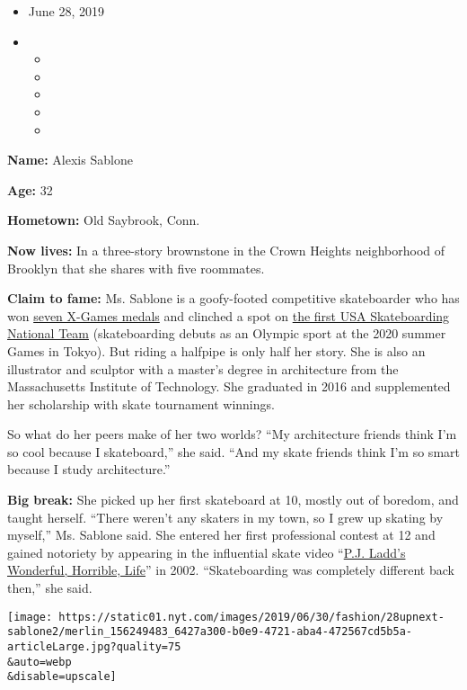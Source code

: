 \begin{itemize}
\item
  June 28, 2019
\item
  \begin{itemize}
  \item
  \item
  \item
  \item
  \item
  \end{itemize}
\end{itemize}

\textbf{Name:} Alexis Sablone

\textbf{Age:} 32

\textbf{Hometown:} Old Saybrook, Conn.

\textbf{Now lives:} In a three-story brownstone in the Crown Heights
neighborhood of Brooklyn that she shares with five roommates.

\textbf{Claim to fame:} Ms. Sablone is a goofy-footed competitive
skateboarder who has won
\href{http://www.xgames.com/athletes/3015198/alexis-sablone}{seven
X-Games medals} and clinched a spot on
\href{https://skateboarding.transworld.net/news/usa-skateboarding-olympic-team-announced/}{the
first USA Skateboarding National Team} (skateboarding debuts as an
Olympic sport at the 2020 summer Games in Tokyo). But riding a halfpipe
is only half her story. She is also an illustrator and sculptor with a
master's degree in architecture from the Massachusetts Institute of
Technology. She graduated in 2016 and supplemented her scholarship with
skate tournament winnings.

So what do her peers make of her two worlds? ``My architecture friends
think I'm so cool because I skateboard,'' she said. ``And my skate
friends think I'm so smart because I study architecture.''

\textbf{Big break:} She picked up her first skateboard at 10, mostly out
of boredom, and taught herself. ``There weren't any skaters in my town,
so I grew up skating by myself,'' Ms. Sablone said. She entered her
first professional contest at 12 and gained notoriety by appearing in
the influential skate video
``\href{http://www.skatevideosite.com/skatevideos/coliseum-pj-ladds-wonderful-horrible-life/soundtrack}{P.J.
Ladd's Wonderful, Horrible, Life}'' in 2002. ``Skateboarding was
completely different back then,'' she said.

\texttt{[image: https://static01.nyt.com/images/2019/06/30/fashion/28upnext-sablone2/merlin\_156249483\_6427a300-b0e9-4721-aba4-472567cd5b5a-articleLarge.jpg?quality=75\\\&auto=webp\\\&disable=upscale]}


